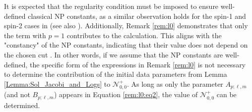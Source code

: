 It is expected that the regularity condition must be imposed to ensure well-defined classical NP constants, as a similar observation holds for the spin-1 and spin-2 cases in \cite{GasVal20} (see also \cite{Val98, Val99a}). Additionally, Remark \ref{rem:l0} demonstrates that only the term with $p=1$ contributes to the calculation. This aligns with the "constancy" of the NP constants, indicating that their value does not depend on the chosen cut \cite{NewPen68}. In other words, if we assume that the NP constants are well-defined, the specific form of the expressions in Remark \ref{rem:l0} is not necessary to determine the contribution of the initial data parameters from Lemma \ref{Lemma:Sol_Jacobi_and_Logs} to $\mathcal{N}^{+}_{0,0}$. As long as only the parameter $A_{p;\ell,m}$ (and not $B_{p;\ell,m}$) appears in Equation \ref{rem:l0:eq2}, the value of $\mathcal{N}^{+}_{0,0}$ can be determined. 
\pagebreak

